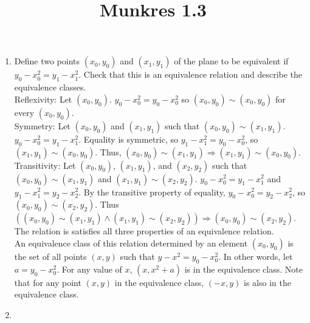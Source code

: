 \documentclass{article}
\title{Munkres 1.3}
\date{}
\begin{document}
\maketitle

\begin{enumerate}
    \item Define two points $(x_{0}, y_{0})$ and $(x_{1}, y_{1})$ of the plane to be equivalent if $y_{0} - x_{0}^{2} = y_{1} - x_{1}^{2}$. Check that this is an equivalence relation and describe the equivalence classes.\\
    Reflexivity: Let $(x_{0}, y_{0})$. $y_{0} - x_{0}^{2} = y_{0} - x_{0}^{2}$ so $(x_{0}, y_{0}) \sim (x_{0}, y_{0})$ for every $(x_{0}, y_{0})$.\\
    Symmetry: Let $(x_{0}, y_{0})$ and $(x_{1}, y_{1})$ such that $(x_{0}, y_{0}) \sim (x_{1}, y_{1})$. $y_{0} - x_{0}^{2} = y_{1} - x_{1}^{2}$. Equality is symmetric, so $y_{1} - x_{1}^{2} = y_{0} - x_{0}^{2}$, so $(x_{1}, y_{1}) \sim (x_{0}, y_{0})$. Thus, $(x_{0}, y_{0}) \sim (x_{1}, y_{1}) \Rightarrow (x_{1}, y_{1}) \sim (x_{0}, y_{0})$.\\
    Transitivity: Let $(x_{0}, y_{0})$, $(x_{1}, y_{1})$, and $(x_{2}, y_{2})$ such that $(x_{0}, y_{0}) \sim (x_{1}, y_{1})$ and $(x_{1}, y_{1}) \sim (x_{2}, y_{2})$. $y_{0} - x_{0}^{2} = y_{1} - x_{1}^{2}$ and $y_{1} - x_{1}^{2} = y_{2} - x_{2}^{2}$. By the transitive property of equality, $y_{0} - x_{0}^{2} = y_{2} - x_{2}^{2}$, so $(x_{0}, y_{0}) \sim (x_{2}, y_{2})$. Thus $((x_{0}, y_{0}) \sim (x_{1}, y_{1}) \land (x_{1}, y_{1}) \sim (x_{2}, y_{2})) \Rightarrow (x_{0}, y_{0}) \sim (x_{2}, y_{2})$.
    The relation is satisfies all three properties of an equivalence relation.\\

    An equivalence class of this relation determined by an element $(x_{0}, y_{0})$ is the set of all points $(x, y)$ such that $y-x^{2} = y_{0} - x_{0}^2$. In other words, let $a = y_{0} - x_{0}^2$. For any value of $x$, $(x, x^{2} + a)$ is in the equivalence class. 
    Note that for any point $(x, y)$ in the equivalence class, $(-x, y)$ is also in the equivalence class.
    \item 
\end{enumerate}
\end{document}
